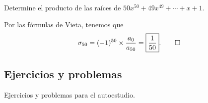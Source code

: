 \begin{example}
    Determine el producto de las raíces de $50x^{50} + 49x^{49} + \cdots + x + 1.$
\end{example}
\begin{solution}
    Por las fórmulas de Vieta, tenemos que
    \[
        \sigma_{50} = (-1)^{50} \times \frac{a_0}{a_{50}} = \boxed{\frac{1}{50}}. \qedhere
    \]
\end{solution}



\subsection{Ejercicios y problemas}

Ejercicios y problemas para el autoestudio.

\showLine
